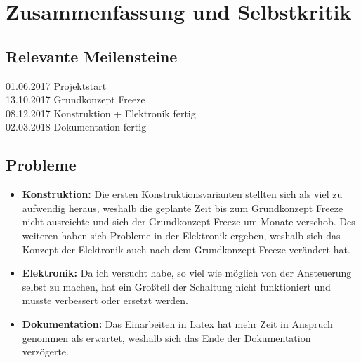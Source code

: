 \newpage
\section{Zusammenfassung und Selbstkritik}
\subsection{Relevante Meilensteine}
01.06.2017 Projektstart \\

13.10.2017 Grundkonzept Freeze\\

08.12.2017 Konstruktion + Elektronik fertig\\

02.03.2018 Dokumentation fertig\\ 
\subsection{Probleme}
\begin{itemize}
\item \textbf{Konstruktion:} Die ersten Konstruktionsvarianten stellten sich als viel zu aufwendig heraus, weshalb die geplante Zeit bis zum Grundkonzept Freeze nicht ausreichte und sich der Grundkonzept Freeze um Monate verschob. Des weiteren haben sich Probleme in der Elektronik ergeben, weshalb sich das Konzept der Elektronik auch nach dem Grundkonzept Freeze verändert hat.
\item \textbf{Elektronik:} Da ich versucht habe, so viel wie möglich von der Ansteuerung selbst zu machen, hat ein Großteil der Schaltung nicht funktioniert und musste verbessert oder ersetzt werden. 
\item \textbf{Dokumentation:} Das Einarbeiten in Latex hat mehr Zeit in Anspruch genommen als erwartet, weshalb sich das Ende der Dokumentation verzögerte.
\end{itemize}
